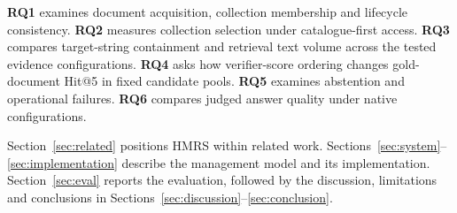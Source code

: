  \textbf{RQ1} examines document acquisition, collection membership and
lifecycle consistency. \textbf{RQ2} measures collection selection under
catalogue-first access. \textbf{RQ3} compares target-string containment
and retrieval text volume across the tested evidence configurations.
\textbf{RQ4} asks how verifier-score ordering changes gold-document
Hit@5 in fixed candidate pools. \textbf{RQ5} examines abstention and
operational failures. \textbf{RQ6} compares judged answer quality under
native configurations.

Section~\ref{sec:related} positions HMRS within related work.
Sections~\ref{sec:system}--\ref{sec:implementation} describe the management
model and its implementation. Section~\ref{sec:eval} reports the evaluation,
followed by the discussion, limitations and conclusions in
Sections~\ref{sec:discussion}--\ref{sec:conclusion}.
